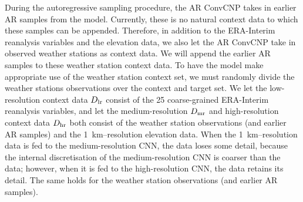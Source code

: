 \documentclass[12pt, twoside]{report}
\begin{document}
During the autoregressive sampling procedure, the AR ConvCNP takes in earlier AR samples from the model.
Currently, these is no natural context data to which these samples can be appended.
Therefore, in addition to the ERA-Interim reanalysis variables and the elevation data, we also let the AR ConvCNP take in observed weather stations as context data.
We will append the earlier AR samples to these weather station context data.
To have the model make appropriate use of the weather station context set,
we must randomly divide the weather stations observations over the context and target set.
We let the low-resolution context data $D\ss{lr}$ consist of the 25 coarse-grained ERA-Interim reanalysis variables,
and let the medium-resolution $D\ss{mr}$ and high-resolution context data $D\ss{hr}$ both consist of the weather station observations (and earlier AR samples) and the \SI{1}{km}--resolution elevation data.
When the \SI{1}{km}--resolution data is fed to the medium-resolution CNN, the data loses some detail, because the internal discretisation of the medium-resolution CNN is coarser than the data;
however, when it is fed to the high-resolution CNN, the data retains its detail.
The same holds for the weather station observations (and earlier AR samples).
\end{document}
